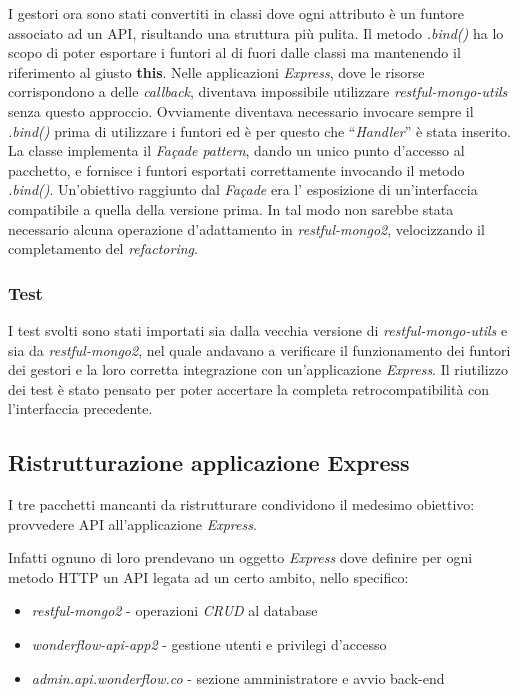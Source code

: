I gestori ora sono stati convertiti in classi dove ogni attributo è un funtore
associato ad un \gls{API}, risultando una struttura più pulita. Il metodo
\textit{.bind()} ha lo scopo di poter esportare i funtori al di fuori dalle
classi ma mantenendo il riferimento al giusto \textbf{this}. Nelle applicazioni
\textit{Express}, dove le risorse corrispondono a delle \textit{callback},
diventava impossibile utilizzare \textit{restful-mongo-utils} senza questo
approccio. Ovviamente diventava necessario invocare sempre il \textit{.bind()}
prima di utilizzare i funtori ed è per questo che ``\textit{Handler}'' è stata
inserito. La classe implementa il \textit{Façade pattern}, dando un unico punto
d'accesso al pacchetto, e fornisce i funtori esportati correttamente invocando
il metodo \textit{.bind()}. Un'obiettivo raggiunto dal \textit{Façade} era l'
esposizione di un'interfaccia compatibile a quella della versione prima.
In tal modo non sarebbe stata necessario alcuna operazione d'adattamento in
\textit{restful-mongo2}, velocizzando il completamento del \textit{refactoring}.

\subsubsection{Test}
I test svolti sono stati importati sia dalla vecchia versione di
\textit{restful-mongo-utils} e sia da \textit{restful-mongo2}, nel quale
andavano a verificare il funzionamento dei funtori dei gestori e la loro
corretta integrazione con un'applicazione \textit{Express}. Il riutilizzo dei
test è stato pensato per poter accertare la completa retrocompatibilità con
l'interfaccia precedente.

\subsection{Ristrutturazione applicazione Express}
I tre pacchetti mancanti da ristrutturare condividono il medesimo obiettivo:
provvedere \gls{API} all'applicazione \textit{Express}.

Infatti ognuno di loro prendevano un oggetto \textit{Express} dove definire per
ogni metodo HTTP un \gls{API} legata ad un certo ambito, nello specifico:
\begin{itemize}
\item \textit{restful-mongo2} - operazioni \textit{CRUD} al database
\item \textit{wonderflow-api-app2} - gestione utenti e privilegi d'accesso
\item \textit{admin.api.wonderflow.co} - sezione amministratore e avvio
\gls{back-end}
\end{itemize}

